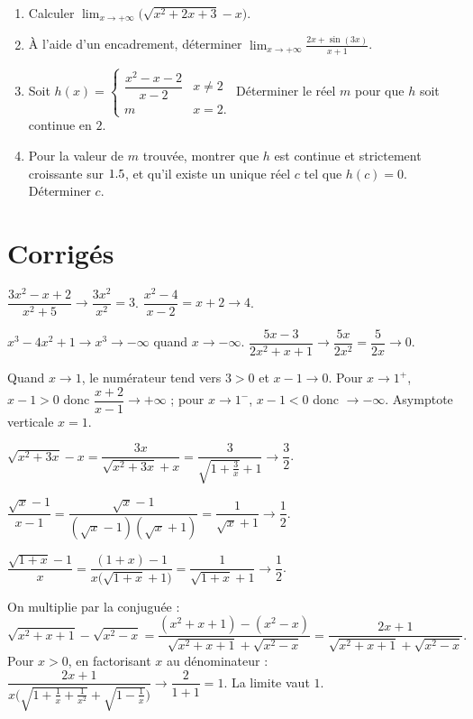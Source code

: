 \begin{enumerate}[label=\arabic*)]
\item Calculer $\displaystyle\lim_{x\to+\infty}\big(\sqrt{x^{2}+2x+3}-x\big)$.
\item À l'aide d'un encadrement, déterminer $\displaystyle\lim_{x\to+\infty}\frac{2x+\sin(3x)}{x+1}$.
\item Soit $\displaystyle h(x)=\begin{cases}\dfrac{x^{2}-x-2}{x-2} & x\neq2\\[4pt] m & x=2.\end{cases}$ Déterminer le réel $m$ pour que $h$ soit continue en $2$.
\item Pour la valeur de $m$ trouvée, montrer que $h$ est continue et strictement croissante sur $1.5$, et qu'il existe un unique réel $c$ tel que $h(c)=0$. Déterminer $c$.
\end{enumerate}

\section{Corrigés}

$\dfrac{3x^{2}-x+2}{x^{2}+5}\to\dfrac{3x^{2}}{x^{2}}=3$. \quad $\dfrac{x^{2}-4}{x-2}=x+2\to4$.

$x^{3}-4x^{2}+1\to x^{3}\to-\infty$ quand $x\to-\infty$. \quad $\dfrac{5x-3}{2x^{2}+x+1}\to\dfrac{5x}{2x^{2}}=\dfrac{5}{2x}\to0$.

Quand $x\to1$, le numérateur tend vers $3>0$ et $x-1\to0$. Pour $x\to1^{+}$, $x-1>0$ donc $\dfrac{x+2}{x-1}\to+\infty$ ; pour $x\to1^{-}$, $x-1<0$ donc $\to-\infty$. Asymptote verticale $x=1$.

$\sqrt{x^{2}+3x}-x=\dfrac{3x}{\sqrt{x^{2}+3x}+x}=\dfrac{3}{\sqrt{1+\frac3x}+1}\to\dfrac32$.

\noindent$\dfrac{\sqrt x-1}{x-1}=\dfrac{\sqrt x-1}{(\sqrt x-1)(\sqrt x+1)}=\dfrac1{\sqrt x+1}\to\dfrac12$.

$\dfrac{\sqrt{1+x}-1}{x}=\dfrac{(1+x)-1}{x\big(\sqrt{1+x}+1\big)}=\dfrac{1}{\sqrt{1+x}+1}\to\dfrac12$.

On multiplie par la conjuguée :
\[
\sqrt{x^{2}+x+1}-\sqrt{x^{2}-x}=\frac{(x^{2}+x+1)-(x^{2}-x)}{\sqrt{x^{2}+x+1}+\sqrt{x^{2}-x}}=\frac{2x+1}{\sqrt{x^{2}+x+1}+\sqrt{x^{2}-x}}.
\]
Pour $x>0$, en factorisant $x$ au dénominateur : $\dfrac{2x+1}{x\big(\sqrt{1+\frac1x+\frac1{x^{2}}}+\sqrt{1-\frac1x}\big)}\to\dfrac{2}{1+1}=1$. La limite vaut $1$.

